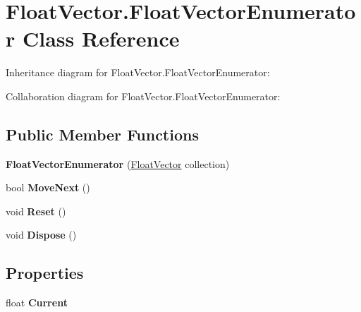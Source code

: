\hypertarget{class_float_vector_1_1_float_vector_enumerator}{\section{Float\+Vector.\+Float\+Vector\+Enumerator Class Reference}
\label{class_float_vector_1_1_float_vector_enumerator}
}


Inheritance diagram for Float\+Vector.\+Float\+Vector\+Enumerator\+:


Collaboration diagram for Float\+Vector.\+Float\+Vector\+Enumerator\+:
\subsection*{Public Member Functions}
\begin{DoxyCompactItemize}
\item 
\hypertarget{class_float_vector_1_1_float_vector_enumerator_a2a1bcfaa95002e81d1b97c54f0df14df}{{\bfseries Float\+Vector\+Enumerator} (\hyperlink{class_float_vector}{Float\+Vector} collection)}\label{class_float_vector_1_1_float_vector_enumerator_a2a1bcfaa95002e81d1b97c54f0df14df}

\item 
\hypertarget{class_float_vector_1_1_float_vector_enumerator_ac12ebc443fc89233f3ece61c723f1119}{bool {\bfseries Move\+Next} ()}\label{class_float_vector_1_1_float_vector_enumerator_ac12ebc443fc89233f3ece61c723f1119}

\item 
\hypertarget{class_float_vector_1_1_float_vector_enumerator_a7ed5e247022223cb39b8dd8aaa3df461}{void {\bfseries Reset} ()}\label{class_float_vector_1_1_float_vector_enumerator_a7ed5e247022223cb39b8dd8aaa3df461}

\item 
\hypertarget{class_float_vector_1_1_float_vector_enumerator_ab4cf6e0abfeb933469374368d5a3ca03}{void {\bfseries Dispose} ()}\label{class_float_vector_1_1_float_vector_enumerator_ab4cf6e0abfeb933469374368d5a3ca03}

\end{DoxyCompactItemize}
\subsection*{Properties}
\begin{DoxyCompactItemize}
\item 
\hypertarget{class_float_vector_1_1_float_vector_enumerator_affe919806f5a3bb2f495ede40ec1bae1}{float {\bfseries Current}}\label{class_float_vector_1_1_float_vector_enumerator_affe919806f5a3bb2f495ede40ec1bae1}

\end{DoxyCompactItemize}


